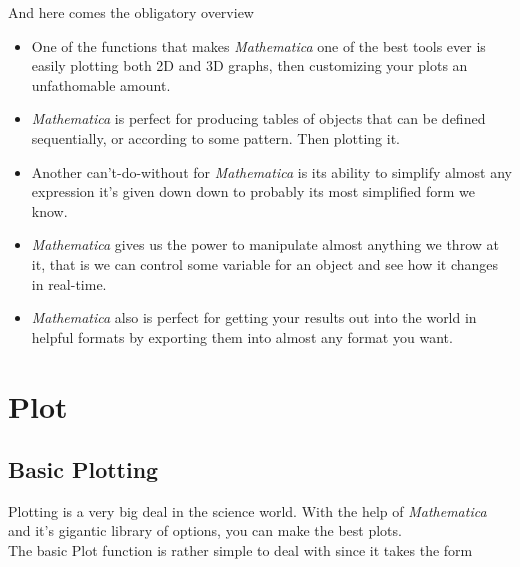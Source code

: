 \documentclass[11pt,letterpaper,twoside,titlepage]{report}
\newcommand{\Mathematica}{\textit{Mathematica} }
\begin{document}
		And here comes the obligatory overview
		
		\begin{itemize}
		
			\item %
			
				One of the functions that makes \Mathematica one of the best tools ever is easily plotting both 2D and 3D graphs, then customizing your plots an unfathomable amount.
				
			\item %
			
				\Mathematica is perfect for producing tables of objects that can be defined sequentially, or according to some pattern.  Then plotting it.
				
			\item %
			
				Another can't-do-without for \Mathematica is its ability to simplify almost any expression it's given down down to probably its most simplified form we know.
				
			\item %
			
				\Mathematica gives us the power to manipulate almost anything we throw at it, that is we can control some variable for an object and see how it changes in real-time.
				
			\item %
			
				\Mathematica also is perfect for getting your results out into the world in helpful formats by exporting them into almost any format you want.
		
		\end{itemize}
		
		\chapter{Plot}
		
			\section{Basic Plotting}
		
				Plotting is a very big deal in the science world.  With the help of \Mathematica and it's gigantic library of options, you can make the best plots. \\
				
				The basic Plot function is rather simple to deal with since it takes the form
			
\end{document}
